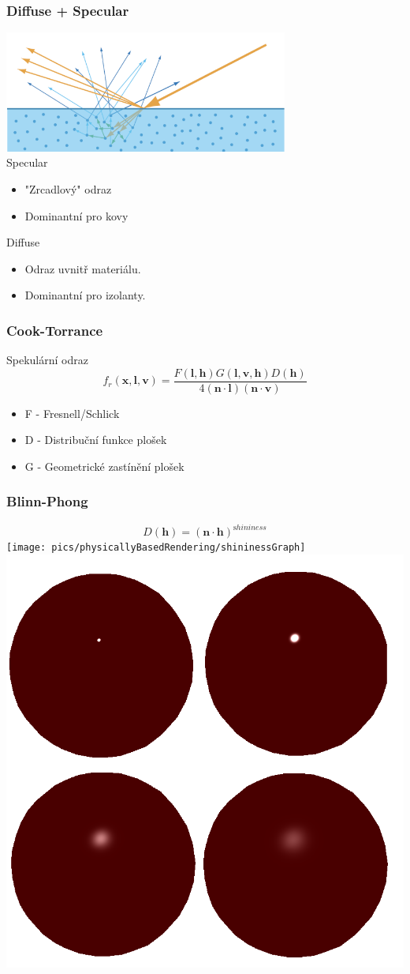 \begin{frame}
    \frametitle{Diffuse + Specular}
    \includegraphics[width=0.7\textwidth]{pics/physicallyBasedRendering/ds} \\
    Specular
    \begin{itemize}
        \item "Zrcadlový" odraz
        \item Dominantní pro kovy
    \end{itemize}
    Diffuse
    \begin{itemize}
        \item Odraz uvnitř materiálu.
        \item Dominantní pro izolanty.
    \end{itemize}
\end{frame}

\begin{frame}
    \frametitle{Cook-Torrance}
    Spekulární odraz
    \begin{equation*}
        f_r(\mathbf x, \mathbf l, \mathbf v) = \frac{F(\mathbf l, \mathbf h)G(\mathbf l, \mathbf v, \mathbf h)D(\mathbf h)}{4(\mathbf n \cdot \mathbf l)(\mathbf n \cdot \mathbf v)}
    \end{equation*}
    \begin{itemize}
        \item F - Fresnell/Schlick
        \item D - Distribuční funkce plošek
        \item G - Geometrické zastínění plošek
    \end{itemize}
\end{frame}

\begin{frame}
    \frametitle{Blinn-Phong}
    \begin{equation*}
        D(\mathbf h) = (\mathbf n \cdot \mathbf h)^{\mathrm shininess}
    \end{equation*}
    \texttt{[image: pics/physicallyBasedRendering/shininessGraph]}
    \includegraphics[width=.5\textwidth]{pics/physicallyBasedRendering/shininess.png}
\end{frame}

